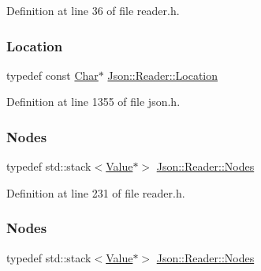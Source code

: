 Definition at line 36 of file reader.\+h.

\hypertarget{class_json_1_1_reader_a46795b5b272bf79a7730e406cb96375a}{}\label{class_json_1_1_reader_a46795b5b272bf79a7730e406cb96375a} 
\subsubsection{\texorpdfstring{Location}{Location}\hspace{0.1cm}{\footnotesize\ttfamily [2/2]}}
{\footnotesize\ttfamily typedef const \hyperlink{class_json_1_1_reader_a3eec9118f3e9a672ba8348c3a79d0f45}{Char}$\ast$ \hyperlink{class_json_1_1_reader_a46795b5b272bf79a7730e406cb96375a}{Json\+::\+Reader\+::\+Location}}



Definition at line 1355 of file json.\+h.

\hypertarget{class_json_1_1_reader_a8da2114fe8b8124d41ea2f3434f0171b}{}\label{class_json_1_1_reader_a8da2114fe8b8124d41ea2f3434f0171b} 
\subsubsection{\texorpdfstring{Nodes}{Nodes}\hspace{0.1cm}{\footnotesize\ttfamily [1/2]}}
{\footnotesize\ttfamily typedef std\+::stack$<$\hyperlink{class_json_1_1_value}{Value}$\ast$$>$ \hyperlink{class_json_1_1_reader_a8da2114fe8b8124d41ea2f3434f0171b}{Json\+::\+Reader\+::\+Nodes}\hspace{0.3cm}{\ttfamily [private]}}



Definition at line 231 of file reader.\+h.

\hypertarget{class_json_1_1_reader_a8da2114fe8b8124d41ea2f3434f0171b}{}\label{class_json_1_1_reader_a8da2114fe8b8124d41ea2f3434f0171b} 
\subsubsection{\texorpdfstring{Nodes}{Nodes}\hspace{0.1cm}{\footnotesize\ttfamily [2/2]}}
{\footnotesize\ttfamily typedef std\+::stack$<$\hyperlink{class_json_1_1_value}{Value}$\ast$$>$ \hyperlink{class_json_1_1_reader_a8da2114fe8b8124d41ea2f3434f0171b}{Json\+::\+Reader\+::\+Nodes}\hspace{0.3cm}{\ttfamily [private]}}



